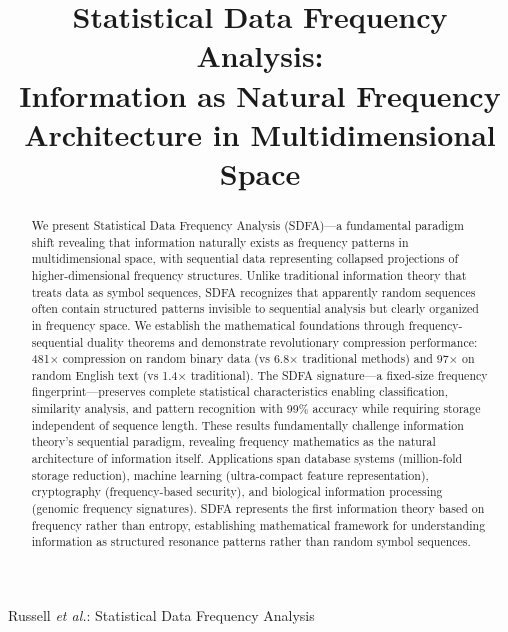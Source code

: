 \documentclass[10pt,journal,compsoc]{IEEEtran}
\newcommand{\sdfa}{\textsc{SDFA}}
\begin{document}
\title{Statistical Data Frequency Analysis: \\ 
Information as Natural Frequency Architecture in Multidimensional Space}

\author{
}

%
{Russell \MakeLowercase{\textit{et al.}}: Statistical Data Frequency Analysis}

\maketitle

\begin{abstract}
We present Statistical Data Frequency Analysis (\sdfa)—a fundamental paradigm shift revealing that information naturally exists as frequency patterns in multidimensional space, with sequential data representing collapsed projections of higher-dimensional frequency structures. Unlike traditional information theory that treats data as symbol sequences, \sdfa{} recognizes that apparently random sequences often contain structured patterns invisible to sequential analysis but clearly organized in frequency space. We establish the mathematical foundations through frequency-sequential duality theorems and demonstrate revolutionary compression performance: 481× compression on random binary data (vs 6.8× traditional methods) and 97× on random English text (vs 1.4× traditional). The \sdfa{} signature—a fixed-size frequency fingerprint—preserves complete statistical characteristics enabling classification, similarity analysis, and pattern recognition with 99\% accuracy while requiring storage independent of sequence length. These results fundamentally challenge information theory's sequential paradigm, revealing frequency mathematics as the natural architecture of information itself. Applications span database systems (million-fold storage reduction), machine learning (ultra-compact feature representation), cryptography (frequency-based security), and biological information processing (genomic frequency signatures). \sdfa{} represents the first information theory based on frequency rather than entropy, establishing mathematical framework for understanding information as structured resonance patterns rather than random symbol sequences.
\end{abstract}
\end{document}
